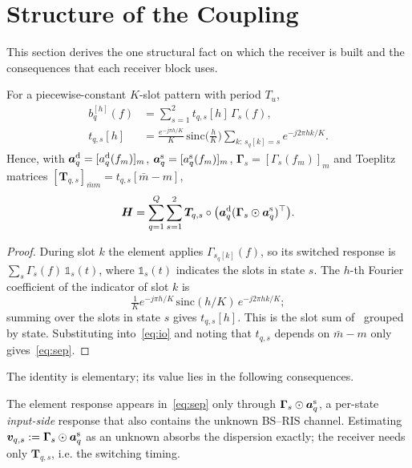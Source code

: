 \section{Structure of the Coupling}\label{sec:structure}

This section derives the one structural fact on which the receiver is built and the
consequences that each receiver block uses.

\begin{proposition}\label{prop:sep}
For a piecewise-constant $K$-slot pattern with period $T_u$,
\begin{align}
b_q^{[h]}(f)&=\sum_{s=1}^{2}t_{q,s}[h]\,\Gamma_s(f),\nonumber\\
t_{q,s}[h]&=\frac{e^{-j\pi h/K}}{K}\,\mathrm{sinc}\!\Big(\frac hK\Big)\sum_{k:\,s_q[k]=s}e^{-j2\pi hk/K}.
\label{eq:tqs}
\end{align}
Hence, with $\bm a^{\rm d}_q=[a^{\rm d}_q(f_m)]_m$, $\bm a^{\rm s}_q=[a^{\rm s}_q(f_m)]_m$,
$\bm\Gamma_s=[\Gamma_s(f_m)]_m$ and Toeplitz matrices $[\bm T_{q,s}]_{\bar m m}=t_{q,s}[\bar m-m]$,
\begin{equation}
\bm H=\sum_{q=1}^{Q}\sum_{s=1}^{2}\bm T_{q,s}\circ\big(\bm a^{\rm d}_q(\bm\Gamma_s\odot\bm a^{\rm s}_q)^{\top}\big).
\label{eq:sep}
\end{equation}
\end{proposition}
\begin{proof}
During slot $k$ the element applies $\Gamma_{s_q[k]}(f)$, so its switched response is
$\sum_s\Gamma_s(f)\,\mathbb 1_s(t)$, where $\mathbb 1_s(t)$ indicates the slots in state $s$.
The $h$-th Fourier coefficient of the indicator of slot $k$ is
\[\tfrac1K e^{-j\pi h/K}\,\mathrm{sinc}(h/K)\,e^{-j2\pi hk/K};\]
summing over the slots in state $s$ gives $t_{q,s}[h]$. This is the slot sum of~\cite[eq.~(5)]{iudice2026} grouped by state.
Substituting into~\eqref{eq:io} and noting that $t_{q,s}$ depends on $\bar m-m$ only gives~\eqref{eq:sep}.
\end{proof}

The identity is elementary; its value lies in the following consequences.

\begin{corollary}\label{cor:nomodel}
The element response appears in~\eqref{eq:sep} only through $\bm\Gamma_s\odot\bm a^{\rm s}_q$,
a per-state \emph{input-side} response that also contains the unknown BS--RIS channel.
Estimating $\bm v_{q,s}:=\bm\Gamma_s\odot\bm a^{\rm s}_q$ as an unknown absorbs the dispersion
exactly; the receiver needs only $\bm T_{q,s}$, i.e. the switching timing.
\end{corollary}


